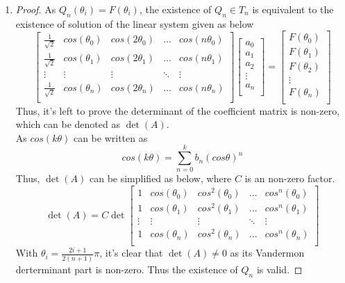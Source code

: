 \documentclass[paper=a4, fontsize=11pt]{scrartcl} %
\numberwithin{equation}{section} %
\numberwithin{figure}{section} %
\numberwithin{table}{section} %
\begin{document}
\begin{enumerate}
\begin{proof}
		\end{proof}
	\item 
		\begin{proof}
			As $Q_n(\theta_i) = F(\theta_i)$, the existence of $Q_n \in T_n$ is equivalent to the existence of solution of the linear system given as below
			\begin{equation}
				\begin{bmatrix}
					\frac{1}{\sqrt{2}} & cos(\theta_0) & cos(2\theta_0) & ... & cos(n\theta_0) \\
					\frac{1}{\sqrt{2}} & cos(\theta_1) & cos(2\theta_1) & ... & cos(n\theta_1) \\
					\vdots                 & \vdots           & \vdots             & \ddots  & \vdots     \\
					\frac{1}{\sqrt{2}} & cos(\theta_n) & cos(2\theta_n) & ... & cos(n\theta_n) \\
				\end{bmatrix}
				\begin{bmatrix}
					a_0 \\ a_1 \\ a_2 \\ \vdots \\ a_n\\
				\end{bmatrix}
				=
				\begin{bmatrix}
					F(\theta_0) \\ F(\theta_1) \\ F(\theta_2) \\ \vdots \\ F(\theta_n)\\
				\end{bmatrix}
			\end{equation}
			Thus, it's left to prove the determinant of the coefficient matrix is non-zero, which can be denoted as $\det(A)$.\\
			As $cos(k\theta)$ can be written as
			\begin{equation}
				cos(k\theta) = \sum_{n=0}^{k} b_n(cos\theta)^n
			\end{equation}
			Thus, $\det(A)$ can be simplified as below, where $C$ is an non-zero factor.
			\begin{equation}
				\det(A) = C \det
				\begin{bmatrix}
					1 & cos(\theta_0) & cos^2(\theta_0) & ... & cos^n(\theta_0) \\
					1 & cos(\theta_1) & cos^2(\theta_1) & ... & cos^n(\theta_1) \\
					\vdots                 & \vdots           & \vdots             & \ddots  & \vdots     \\
					1 & cos(\theta_n) & cos^2(\theta_n) & ... & cos^n(\theta_n) \\
				\end{bmatrix}
			\end{equation}
			With $\theta_i = \frac{2i+1}{2(n+1)}\pi$, it's clear that $\det(A)\neq0$ as its Vandermon derterminant part is non-zero. Thus the existence of $Q_n$ is valid.
		\end{proof}
	

\end{enumerate}
\end{document}
